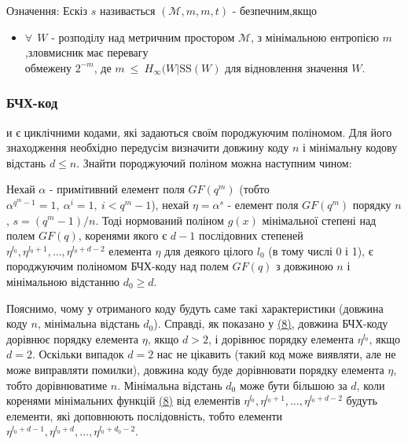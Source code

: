 \documentclass[11pt]{article}
\providecommand{\tightlist}{%
      \setlength{\itemsep}{0pt}\setlength{\parskip}{0pt}}
\begin{document}
Означення: Ескіз \(s\) називається
\((\mathcal{M},m,\overset{\text{~}}{m},t)\) - безпечним,якщо

\begin{itemize}
\tightlist
\item
  \(\forall ~~ W\) - розподілу над метричним простором \(\mathcal{M}\),
  з мінімальною ентропією \(m\),зловмисник має перевагу\\
  обмежену \(2^{-\overset{\text{~}}{m}}\), де
  \(\overset{\text{~}}{m}~\leq~\overset{\text{~}}{H}_{\infty}(W| \text{SS}(W)\)
  для відновлення значення \(W\).
\end{itemize}

    \hypertarget{ux431ux447ux445-ux43aux43eux434}{%
\subsubsection{БЧХ-код}\label{ux431ux447ux445-ux43aux43eux434}}

и є циклічними кодами, які задаються своїм породжуючим поліномом. Для
його знаходження необхідно передусім визначити довжину коду
\({\displaystyle n}\) і мінімальну кодову відстань
\({\displaystyle d\leqslant n}\). Знайти породжуючий поліном можна
наступним чином:

Нехай \({\displaystyle \alpha }\) - примітивний елемент поля
\({\displaystyle GF(q^{m})}\) (тобто
\({\displaystyle \alpha ^{q^{m}-1}=1,\ \alpha ^{i} = 1,\ i<q^{m}-1}\)),
нехай \({\displaystyle \eta =\alpha ^{s}}\) - елемент поля
\({\displaystyle GF(q^{m})}\) порядку \({\displaystyle n}\),
\({\displaystyle s=(q^{m}-1)/n}\). Тоді нормований поліном
\({\displaystyle g(x)}\) мінімальної степені над полем
\({\displaystyle GF(q)}\), коренями якого є \({\displaystyle d-1}\)
послідовних степеней
\({\displaystyle \eta ^{l_{0}},\eta ^{l_{0}+1},\ldots ,\eta ^{l_{0}+d-2}}\)
елемента \({\displaystyle \eta }\) для деякого цілого
\({\displaystyle l_{0}}\) (в тому числі 0 і 1), є породжуючим поліномом
БЧХ-коду над полем \({\displaystyle GF(q)}\) з довжиною
\({\displaystyle n}\) і мінімальною відстанню
\({\displaystyle d_{0}\geqslant d}\).

Пояснимо, чому у отриманого коду будуть саме такі характеристики
(довжина коду \({\displaystyle n}\), мінімальна відстань
\({\displaystyle d_{0}}\)). Справді, як показано у
\hyperref[література]{(8)}, довжина БЧХ-коду дорівнює порядку елемента
\({\displaystyle \eta }\), якщо \({\displaystyle d>2}\), і дорівнює
порядку елемента \({\displaystyle \eta ^{l_{0}}}\), якщо
\({\displaystyle d=2}\). Оскільки випадок \({\displaystyle d=2}\) нас не
цікавить (такий код може виявляти, але не може виправляти помилки),
довжина коду буде дорівнювати порядку елемента
\({\displaystyle \eta }\), тобто дорівнюватиме \({\displaystyle n}\).
Мінімальна відстань \({\displaystyle d_{0}}\) може бути більшою за
\({\displaystyle d}\), коли коренями мінімальних функцій
\hyperref[література]{(8)} від елементів
\({\displaystyle \eta ^{l_{0}},\eta ^{l_{0}+1},\ldots ,\eta ^{l_{0}+d-2}}\)
будуть елементи, які доповнюють послідовність, тобто елементи
\({\displaystyle \eta ^{l_{0}+d-1},\eta ^{l_{0}+d},\ldots ,\eta ^{l_{0}+d_{0}-2}}\).
\end{document}
